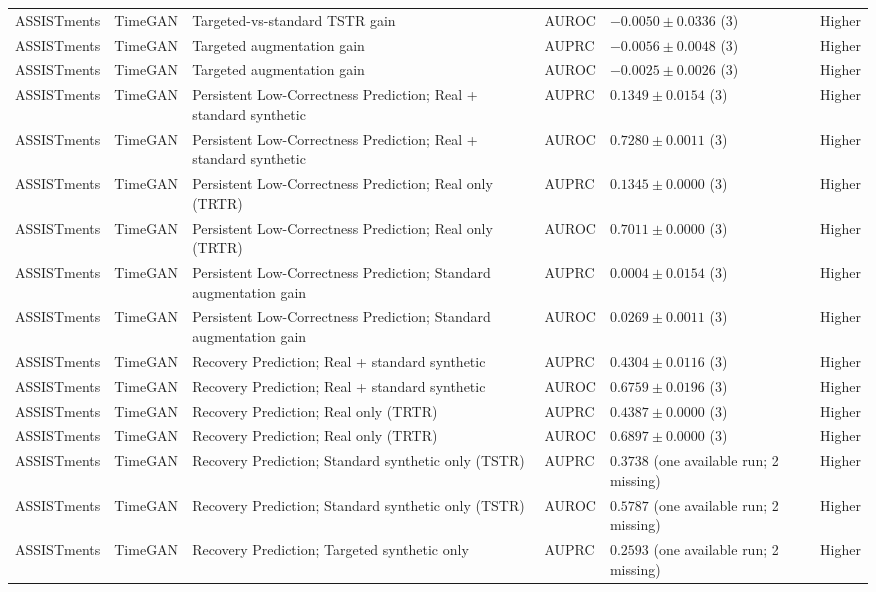 \begin{longtable}{@{}p{2.25cm}p{2.05cm}p{4.7cm}p{5.0cm}p{2.6cm}p{1.25cm}@{}}
ASSISTments & TimeGAN & Targeted-vs-standard TSTR gain & AUROC & $-0.0050 \mathbin{\pm} 0.0336$ (3) & Higher \\
ASSISTments & TimeGAN & Targeted augmentation gain & AUPRC & $-0.0056 \mathbin{\pm} 0.0048$ (3) & Higher \\
ASSISTments & TimeGAN & Targeted augmentation gain & AUROC & $-0.0025 \mathbin{\pm} 0.0026$ (3) & Higher \\
ASSISTments & TimeGAN & Persistent Low-Correctness Prediction; Real + standard synthetic & AUPRC & $0.1349 \mathbin{\pm} 0.0154$ (3) & Higher \\
ASSISTments & TimeGAN & Persistent Low-Correctness Prediction; Real + standard synthetic & AUROC & $0.7280 \mathbin{\pm} 0.0011$ (3) & Higher \\
ASSISTments & TimeGAN & Persistent Low-Correctness Prediction; Real only (TRTR) & AUPRC & $0.1345 \mathbin{\pm} 0.0000$ (3) & Higher \\
ASSISTments & TimeGAN & Persistent Low-Correctness Prediction; Real only (TRTR) & AUROC & $0.7011 \mathbin{\pm} 0.0000$ (3) & Higher \\
ASSISTments & TimeGAN & Persistent Low-Correctness Prediction; Standard augmentation gain & AUPRC & $0.0004 \mathbin{\pm} 0.0154$ (3) & Higher \\
ASSISTments & TimeGAN & Persistent Low-Correctness Prediction; Standard augmentation gain & AUROC & $0.0269 \mathbin{\pm} 0.0011$ (3) & Higher \\
ASSISTments & TimeGAN & Recovery Prediction; Real + standard synthetic & AUPRC & $0.4304 \mathbin{\pm} 0.0116$ (3) & Higher \\
ASSISTments & TimeGAN & Recovery Prediction; Real + standard synthetic & AUROC & $0.6759 \mathbin{\pm} 0.0196$ (3) & Higher \\
ASSISTments & TimeGAN & Recovery Prediction; Real only (TRTR) & AUPRC & $0.4387 \mathbin{\pm} 0.0000$ (3) & Higher \\
ASSISTments & TimeGAN & Recovery Prediction; Real only (TRTR) & AUROC & $0.6897 \mathbin{\pm} 0.0000$ (3) & Higher \\
ASSISTments & TimeGAN & Recovery Prediction; Standard synthetic only (TSTR) & AUPRC & $0.3738$ (one available run; 2 missing) & Higher \\
ASSISTments & TimeGAN & Recovery Prediction; Standard synthetic only (TSTR) & AUROC & $0.5787$ (one available run; 2 missing) & Higher \\
ASSISTments & TimeGAN & Recovery Prediction; Targeted synthetic only & AUPRC & $0.2593$ (one available run; 2 missing) & Higher \\

\end{longtable}
